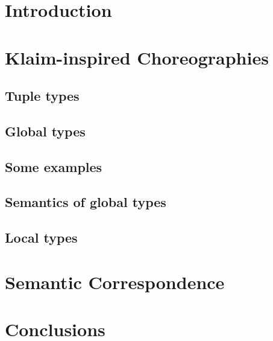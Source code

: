 \documentclass[runningheads,a4paper]{llncs}
\begin{document}
\section{Introduction}
\label{sec:intro}


\section{Klaim-inspired Choreographies}
\label{sec:klaimographies}
\subsection{Tuple types}
\label{sec:tuples}

\subsection{Global types}
\label{sec:gt}

\subsection{Some examples}
\label{sec:examples}

%

\subsection{Semantics of global types}
\label{sec:globsem}


\subsection{Local types}
\label{sec:locsem}


\section{Semantic Correspondence}
\label{sec:corr}


\section{Conclusions}
\label{sec:disc}\label{sec:conc}





\iffinal
\else
 \newpage
 \setcounter{tocdepth}{2}
 \listoffixmes
\fi
\end{document}
